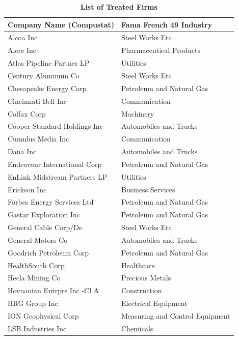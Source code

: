 \documentclass[a4paper, 12pt]{article}
\begin{document}
\begin{table}[htbp]
\caption{\textbf{List of Treated Firms}} \label{table_list}
\begin{singlespace}
\begin{small}

\end{small}
\end{singlespace}
\vspace{3mm}

\small
  \centering
    \begin{tabular}{ll}
    \toprule


Company Name (Compustat) & Fama French 49 Industry \\
\hline
Alcoa Inc&Steel Works Etc\\
Alere Inc&Pharmaceutical Products\\
Atlas Pipeline Partner LP&Utilities\\
Century Aluminum Co&Steel Works Etc\\
Chesapeake Energy Corp&Petroleum and Natural Gas\\
Cincinnati Bell Inc&Communication\\
Colfax Corp&Machinery\\
Cooper-Standard Holdings Inc&Automobiles and Trucks\\
Cumulus Media Inc&Communication\\
Dana Inc&Automobiles and Trucks\\
Endeavour International Corp&Petroleum and Natural Gas\\
EnLink Midstream Partners LP&Utilities\\
Erickson Inc&Business Services\\
Forbes Energy Services Ltd&Petroleum and Natural Gas\\
Gastar Exploration Inc&Petroleum and Natural Gas\\
General Cable Corp/De&Steel Works Etc\\
General Motors Co&Automobiles and Trucks\\
Goodrich Petroleum Corp&Petroleum and Natural Gas\\
HealthSouth Corp&Healthcare\\
Hecla Mining Co&Precious Metals\\
Hovnanian Entrprs Inc  -Cl A&Construction\\
HRG Group Inc&Electrical Equipment\\
ION Geophysical Corp&Measuring and Control Equipment\\
LSB Industries Inc&Chemicals\\

\end{tabular}
\end{table}
\end{document}
